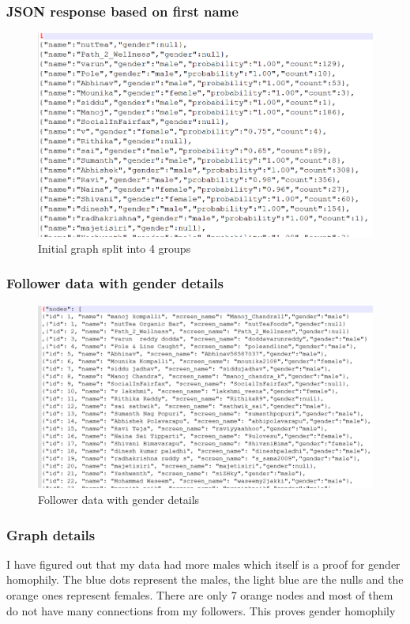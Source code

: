 \documentclass[12pt]{article}
\begin{document}
\subsubsection{JSON response based on first name}
\begin{figure}[ht]
\includegraphics[scale=0.7]{../q2/firstjson.png}
\centering
\caption{Initial graph split into 4 groups}
\label{Initial graph split into 4 groups}
\end{figure}
\newpage

\subsubsection{Follower data with gender details}

 \begin{figure}[ht]
\includegraphics[scale=0.5]{../q2/genderjson.png}
\centering
\caption{Follower data with gender details }
\label{fig:Follower data with gender details}
\end{figure}
\newpage

\subsubsection{Graph details}
 I have figured out that my data had more males which itself is a proof for gender homophily. The blue dots represent the males, the light blue are the nulls and the orange ones represent females. There are only 7 orange nodes and most of them do not have many connections from my followers. This proves gender homophily
\end{document}
